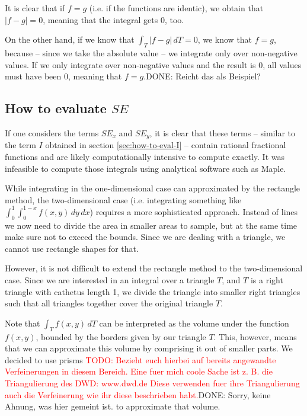 \documentclass{article}
\newcommand{\todo}[2][]{\textcolor{red}{TODO\ifthenelse{\equal{#1}{}}{}{[#1]}: #2}}
\newcommand{\done}[2][]{\textcolor{green!50!black}{DONE\ifthenelse{\equal{#1}{}}{}{[#1]}: #2}}
\begin{document}
It is clear that if $f = g$ (i.e. if the functions are identic), we obtain that $\left| f - g \right| = 0$, meaning that the integral gets 0, too.

On the other hand, if we know that $\int_T \left| f-g \right|\, dT = 0$, we know that $f=g$, because -- since we take the absolute value -- we integrate only over non-negative values. If we only integrate over non-negative values and the result is 0, all values must have been 0, meaning that $f=g$.\done{Reicht das als Beispiel?}

\subsection{\texorpdfstring{How to evaluate $SE$}{How to evaluate SE}}
\label{sec:how-to-evaluate-e}

If one considers the terms $SE_x$ and $SE_y$, it is clear that these terms -- similar to the term $I$ obtained in section \ref{sec:how-to-eval-I} -- contain rational fractional functions and are likely computationally intensive to compute exactly.
It was infeasible to compute those integrals using analytical software such as Maple.

While integrating in the one-dimensional case can approximated by the rectangle method, the two-dimensional case (i.e. integrating something like $\int_{0}^1 \int_0^{1-x} f(x,y)\, dy\, dx$) requires a more sophisticated approach. Instead of lines we now need to divide the area in smaller areas to sample, but at the same time make sure not to exceed the bounds. Since we are dealing with a triangle, we cannot use rectangle shapes for that.

However, it is not difficult to extend the rectangle method to the two-dimensional case. Since we are interested in an integral over a triangle $T$, and $T$ is a right triangle with cathetus length 1, we divide the triangle into smaller right triangles such that all triangles together cover the original triangle $T$.

Note that $\int_T f(x,y)\,dT$ can be interpreted as the volume under the function $f(x,y)$, bounded by the borders given by our triangle $T$. This, however, means that we can approximate this volume by comprising it out of smaller parts. We decided to use prisms \todo{Bezieht euch hierbei auf bereits angewandte Verfeinerungen in diesem Bereich. Eine fuer mich coole Sache ist z. B. die Triangulierung des DWD: www.dwd.de Diese verwenden fuer ihre Triangulierung auch die Verfeinerung wie ihr diese beschrieben habt.}\done{Sorry, keine Ahnung, was hier gemeint ist.} to approximate that volume.
\end{document}
